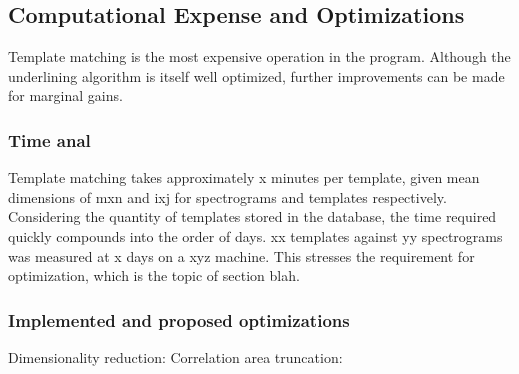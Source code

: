 \subsection{Computational Expense and Optimizations}
Template matching is the most expensive operation in the program.
Although the underlining algorithm is itself well optimized, further
improvements can be made for marginal gains.

\subsubsection{Time anal}
Template matching takes approximately x minutes per template, given
mean dimensions of mxn and ixj for spectrograms and templates respectively.
Considering the quantity of templates stored in the database, the time
required quickly compounds into the order of days.
xx templates against yy spectrograms was measured at x days on a xyz machine.
This stresses the requirement for optimization, which is the topic of
section blah.

\subsubsection{Implemented and proposed optimizations}
Dimensionality reduction:
Correlation area truncation:
